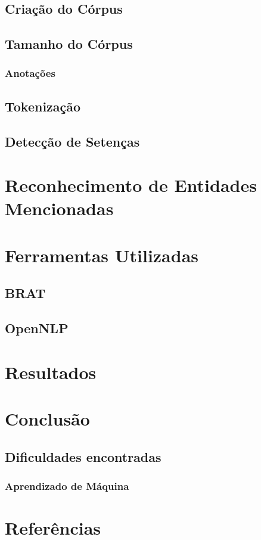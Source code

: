 \documentclass[11pt]{article}
\begin{document}
\subsection{Criação do Córpus}
\subsection{Tamanho do Córpus}
\subsubsection{Anotações}
\subsection{Tokenização}
\subsection{Detecção de Setenças}

\pagebreak
\section{Reconhecimento de Entidades Mencionadas}

\pagebreak
\section{Ferramentas Utilizadas}

\subsection{BRAT}

\subsection{OpenNLP}

\pagebreak
\section{Resultados}

\pagebreak
\section{Conclusão}
\subsection{Dificuldades encontradas}
\subsubsection{Aprendizado de Máquina}

\pagebreak
\section{Referências}
\end{document}
